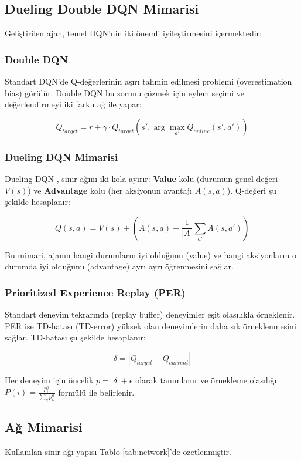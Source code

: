 \documentclass[conference]{IEEEtran}
\begin{document}
\subsection{Dueling Double DQN Mimarisi}
Geliştirilen ajan, temel DQN'nin iki önemli iyileştirmesini içermektedir:

\subsubsection{Double DQN}
Standart DQN'de Q-değerlerinin aşırı tahmin edilmesi problemi (overestimation bias) görülür. Double DQN \cite{van2016deep} bu sorunu çözmek için eylem seçimi ve değerlendirmeyi iki farklı ağ ile yapar:

\[
Q_{target} = r + \gamma \cdot Q_{target}(s', \arg\max_{a'} Q_{online}(s', a'))
\]

\subsubsection{Dueling DQN Mimarisi}
Dueling DQN \cite{wang2016dueling}, sinir ağını iki kola ayırır: \textbf{Value} kolu (durumun genel değeri $V(s)$) ve \textbf{Advantage} kolu (her aksiyonun avantajı $A(s,a)$). Q-değeri şu şekilde hesaplanır:

\[
Q(s,a) = V(s) + \left( A(s,a) - \frac{1}{|A|} \sum_{a'} A(s,a') \right)
\]

Bu mimari, ajanın hangi durumların iyi olduğunu (value) ve hangi aksiyonların o durumda iyi olduğunu (advantage) ayrı ayrı öğrenmesini sağlar.

\subsubsection{Prioritized Experience Replay (PER)}
Standart deneyim tekrarında (replay buffer) deneyimler eşit olasılıkla örneklenir. PER \cite{schaul2015prioritized} ise TD-hatası (TD-error) yüksek olan deneyimlerin daha sık örneklenmesini sağlar. TD-hatası şu şekilde hesaplanır:

\[
\delta = |Q_{target} - Q_{current}|
\]

Her deneyim için öncelik $p = |\delta| + \epsilon$ olarak tanımlanır ve örnekleme olasılığı $P(i) = \frac{p_i^{\alpha}}{\sum_k p_k^{\alpha}}$ formülü ile belirlenir.

\subsection{Ağ Mimarisi}
Kullanılan sinir ağı yapısı Tablo \ref{tab:network}'de özetlenmiştir.
\end{document}
